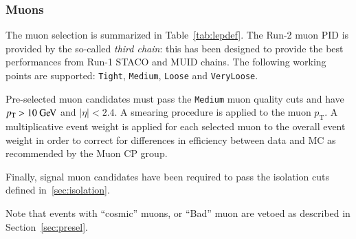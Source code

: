 \subsubsection{Muons}
\label{sec:objects_muons}

The muon selection is summarized in Table~\ref{tab:lepdef}. The Run-2 muon PID is provided by the so-called \textit{third chain}: 
this has been designed to provide the best performances from Run-1 STACO and MUID chains. The following working points are supported:
{\tt Tight}, {\tt Medium}, {\tt Loose} and {\tt VeryLoose}. 

Pre-selected muon candidates must pass the {\tt Medium} muon quality cuts and have  $p_\mathrm{T} > 10\GeV$ and $|\eta| < 2.4$.
A smearing procedure is applied to the muon $p_\mathrm{T}$.  A multiplicative event weight is applied for each selected muon to the overall event weight in order to correct for differences in efficiency between data and MC as recommended by the Muon CP group. 

Finally, signal muon candidates have been required to pass the isolation cuts defined in~\ref{sec:isolation}.

Note that events with ``cosmic'' muons, or ``Bad'' muon are vetoed as described in Section~\ref{sec:presel}.


